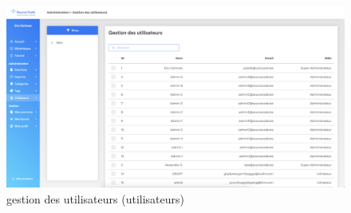 \begin{figure}[H]
    \includegraphics[width=\textwidth,height=\textheight,keepaspectratio]{images/client/users-admin.png}
    \centering
    \caption[SourceCode : gestion des utilisateurs]{gestion des utilisateurs (utilisateurs)}
\end{figure}



